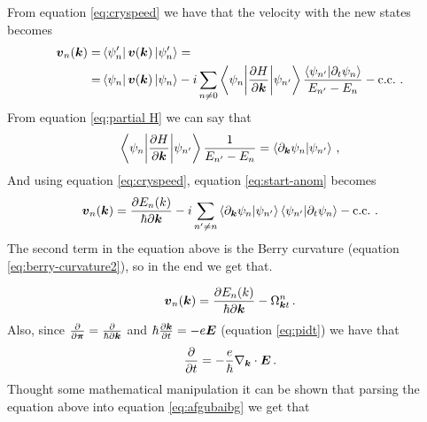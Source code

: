 From equation \ref{eq:cryspeed} we have that the velocity with the new states becomes 
\begin{equation}
    \begin{split}
        \boldsymbol{v}_n(\boldsymbol{k})=&\bra{\psi'_n}\boldsymbol{v}(\boldsymbol{k})\ket{\psi'_n}=\\
        =&\bra{\psi_n}\boldsymbol{v}(\boldsymbol{k})\ket{\psi_n} -i\sum _{n\neq 0}
        \braket{\psi_n\bigg|\frac{\partial H}{\partial \boldsymbol{k} }}{\psi_{n'}}
        \frac{\braket{\psi_{n'}}{\partial_t\psi_n}}{E_{n'}-E_n} - \textrm {c.c.}\,\,.
    \end{split}
    \label{eq:start-anom}
\end{equation}
From equation \ref{eq:partial H} we can say that
\begin{equation}
    \braket{\psi_n\bigg|\frac{\partial H}{\partial \boldsymbol{k} }}{\psi_{n'}}\frac1{E_{n'}-E_n}=\braket{\partial_{\boldsymbol{k}}\psi_n}{\psi_{n'}}\,,
\end{equation}
And using equation \ref{eq:cryspeed}, equation \ref{eq:start-anom} becomes
\begin{equation}
    \boldsymbol{v}_n(\boldsymbol{k})=\frac{\partial E_n (k)}{\hbar\partial \boldsymbol{k}} -i
    \sum_{n'\neq n}
    \braket{\partial_{\boldsymbol{k}}\psi_n}{\psi_{n'}}
    \braket{\psi_{n'}}{\partial_t\psi_n}
    -\textrm{c.c.}\,\,.
\end{equation}
The second term in the equation above is the Berry curvature (equation \ref{eq:berry-curvature2}), so in the end we get that.

\begin{equation}
    \boldsymbol{v}_n(\boldsymbol{k})=\frac{\partial E_n (k)}{\hbar\partial \boldsymbol{k}} -\Omega^n_{\boldsymbol{k}t}
    \label{eq:afgubaibg}\,.
\end{equation}
Also, since $\frac{\partial}{\partial \boldsymbol{\pi}}=\frac \partial{\hbar\partial \boldsymbol{k}}$ and $\hbar\frac{\partial \boldsymbol{k}}{\partial t}=-e\boldsymbol{E}$ (equation \ref{eq:pidt})
we have that
\[
    \frac{\partial }{\partial t}=-\frac e\hbar \nabla_{\boldsymbol{k}}\cdot \boldsymbol{E}    \,.
\]
Thought some mathematical manipulation it can be shown that parsing the equation above into equation \ref{eq:afgubaibg} we get that  \cite{chang1995berry}

